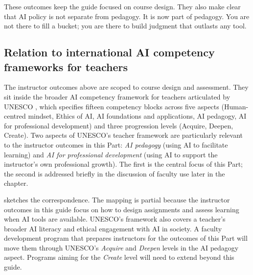 \documentclass{SIAMbook2023}
\begin{document}
These outcomes keep the guide focused on course design. They also make clear that AI policy is not separate from pedagogy. It is now part of pedagogy. You are not there to fill a bucket; you are there to build judgment that outlasts any tool.

\subsection{Relation to international AI competency frameworks for teachers}
\label{i:subsec:instructor-unesco}

The instructor outcomes above are scoped to course design and assessment. They sit inside the broader AI competency framework for teachers articulated by UNESCO \citep{miao2024aib}, which specifies fifteen competency blocks across five aspects (Human-centred mindset, Ethics of AI, AI foundations and applications, AI pedagogy, AI for professional development) and three progression levels (Acquire, Deepen, Create). Two aspects of UNESCO's teacher framework are particularly relevant to the instructor outcomes in this Part: \emph{AI pedagogy} (using AI to facilitate learning) and \emph{AI for professional development} (using AI to support the instructor's own professional growth). The first is the central focus of this Part; the second is addressed briefly in the discussion of faculty use later in the chapter.

 sketches the correspondence. The mapping is partial because the instructor outcomes in this guide focus on how to design assignments and assess learning when AI tools are available. UNESCO's framework also covers a teacher's broader AI literacy and ethical engagement with AI in society. A faculty development program that prepares instructors for the outcomes of this Part will move them through UNESCO's \emph{Acquire} and \emph{Deepen} levels in the AI pedagogy aspect. Programs aiming for the \emph{Create} level will need to extend beyond this guide.
\end{document}
